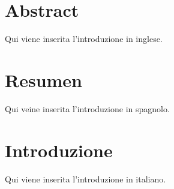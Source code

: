 \chapter{Abstract}
Qui viene inserita l'introduzione in inglese.

\chapter{Resumen}
Qui veine inserita l'introduzione in spagnolo.

\chapter{Introduzione}
Qui viene inserita l'introduzione in italiano.
